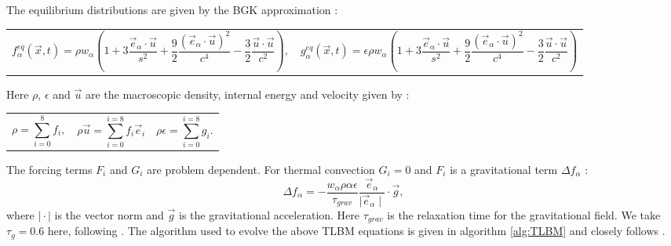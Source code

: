 \documentclass{article}
\begin{document}
\noindent The equilibrium distributions are given by the BGK approximation \cite{qian1992lattice, rothman2004lattice}:
\newline
\begin{tabularx}{\textwidth}{XX}
\begin{equation}
	f^{eq}_{\alpha}(\vec{x}, t)  = \rho w_{\alpha} (1 + 3 \frac{\vec{e}_{\alpha} \cdot \vec{u}}{s^2} + \frac{9}{2} \frac{(\vec{e}_{\alpha} \cdot \vec{u}  )^2}{c^4} - \frac{3}{2} \frac{\vec{u} \cdot \vec{u}}{c^2}  ),
\end{equation}
    &
\begin{equation}
	g^{eq}_{\alpha}(\vec{x}, t)  = \epsilon \rho w_{\alpha} (1 + 3 \frac{\vec{e}_{\alpha} \cdot \vec{u}}{s^2} + \frac{9}{2} \frac{(\vec{e}_{\alpha} \cdot \vec{u}  )^2}{c^4} - \frac{3}{2} \frac{\vec{u} \cdot \vec{u}}{c^2}  )
\end{equation}
\end{tabularx}\par

\noindent Here $\rho$, $\epsilon$ and $\vec{u}$ are the macroscopic density, internal energy and velocity given by \cite{mora2017simulation}:

\begin{tabularx}{\textwidth}{XXX}
\begin{equation}
	\rho = \sum_{i=0}^{8} f_{i},
	\label{LBM rho}
\end{equation}
    &
\begin{equation}
	\rho \vec{u} = \sum_{i=0}^{i=8} f_{i} \vec{e}_{i}
	\label{LBM u}
\end{equation}
	&
\begin{equation}
	\rho \epsilon = \sum_{i=0}^{i=8} g_{i}.
	\label{LBM ep}
\end{equation}
\end{tabularx}\par

\noindent The forcing terms $F_i$ and $G_i$ are problem dependent. For thermal convection 
$G_i=0$ and $F_i$ is a gravitational term ${\Delta f}_{\alpha}$ \cite{mora2017simulation}:
\begin{equation}
	{\Delta f}_{\alpha} = - 
	\frac{w_{\alpha} \rho \alpha \epsilon}{\tau_{grav}}
	 \frac{\vec{e}_{\alpha}}{\mid \vec{e}_{\alpha} \mid} \cdot \vec{g} ,
\end{equation}
\noindent where $\mid \cdot \mid$ is the vector norm and $\vec{g}$ is the gravitational 
acceleration. Here $\tau_{grav}$ is the relaxation time for the gravitational field. We 
take $\tau_g=0.6$ here, following \cite{mora2017simulation}. The algorithm used to evolve 
the above TLBM equations is given in algorithm \ref{alg:TLBM} and closely follows 
\cite{mora2017simulation}.
\end{document}
